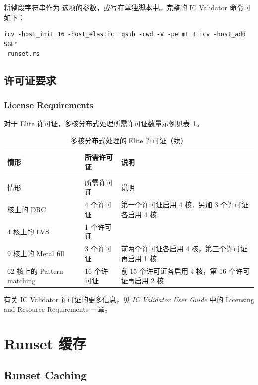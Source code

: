 将整段字符串作为  选项的参数，或写在单独脚本中。完整的 IC Validator 命令可如下：
\begin{lstlisting}
icv -host_init 16 -host_elastic "qsub -cwd -V -pe mt 8 icv -host_add SGE"
 runset.rs
\end{lstlisting}

\subsection{许可证要求}
\subsubsection*{License Requirements}

对于 Elite 许可证，多核分布式处理所需许可证数量示例见表~\ref{tab:icv-elite-lic}。

\begin{longtable}{p{}p{}p{}}
\caption{多核分布式处理的 Elite 许可证}\label{tab:icv-elite-lic}\\
\toprule
情形 & 所需许可证 & 说明 \\
\midrule
\endfirsthead
\caption[]{多核分布式处理的 Elite 许可证（续）}\\
\toprule
情形 & 所需许可证 & 说明 \\
\midrule
\endhead
\bottomrule
\endfoot
16 核上的 DRC & 4 个许可证 & 第一个许可证启用 4 核，另加 3 个许可证各启用 4 核 \\
4 核上的 LVS & 1 个许可证 & \\
9 核上的 Metal fill & 3 个许可证 & 前两个许可证各启用 4 核，第三个许可证再启用 1 核 \\
62 核上的 Pattern matching & 16 个许可证 & 前 15 个许可证各启用 4 核，第 16 个许可证再启用 2 核 \\
\end{longtable}

有关 IC Validator 许可证的更多信息，见 \textit{IC Validator User Guide} 中的 Licensing and Resource Requirements 一章。

\section{Runset 缓存}
\subsection*{Runset Caching}

